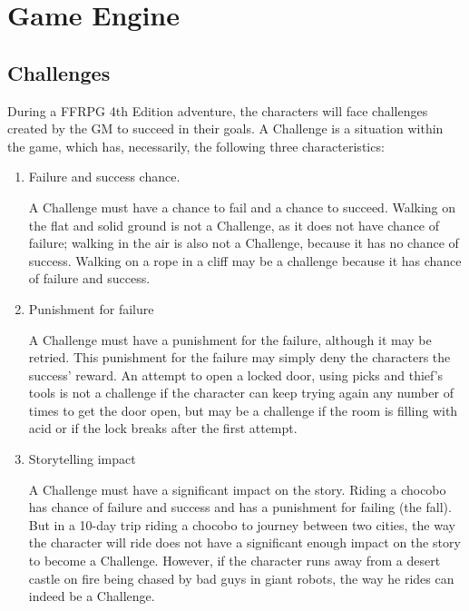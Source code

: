 \section{Game Engine}
\begin{multicols}{2}
\subsection{Challenges}
During a FFRPG 4th Edition adventure, the
characters will face challenges created by the GM
to succeed in their goals. A Challenge is a situation
within the game, which has, necessarily, the
following three characteristics:

\begin{enumerate}[label=\alph*]
\item Failure and success chance.

A Challenge must have a chance to fail and a chance to succeed.
Walking on the flat and solid ground is not a
Challenge, as it does not have chance of failure;
walking in the air is also not a Challenge, because
it has no chance of success. Walking on a rope in a
cliff may be a challenge because it has chance of
failure and success.

\item Punishment for failure

A Challenge must
have a punishment for the failure, although it may
be retried. This punishment for the failure may
simply deny the characters the success’ reward. An
attempt to open a locked door, using picks and
thief’s tools is not a challenge if the character can
keep trying again any number of times to get the
door open, but may be a challenge if the room is
filling with acid or if the lock breaks after the first
attempt.

\item Storytelling impact

A Challenge must
have a significant impact on the story. Riding a
chocobo has chance of failure and success and has
a punishment for failing (the fall). But in a 10-day
trip riding a chocobo to journey between two cities,
the way the character will ride does not have a
significant enough impact on the story to become
a Challenge. However, if the character runs away
from a desert castle on fire being chased by bad
guys in giant robots, the way he rides can indeed
be a Challenge.

\end{enumerate}


\end{multicols}
